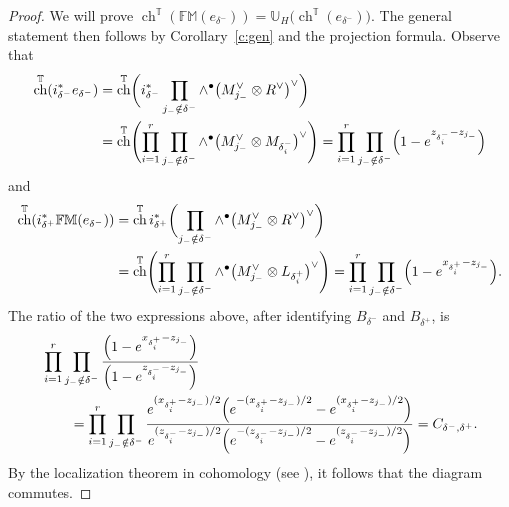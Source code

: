 \documentclass[11pt]{article}
\numberwithin{equation}{section}
\numberwithin{equation}{section}
\newcommand{\UU}{\mathbb{U}}
\newcommand{\torus}{\mathbb{T}}
\newcommand{\FM}{\mathbb{FM}}
\DeclareMathOperator{\ch}{ch}
\newcommand{\MB}{M}
\newcommand{\LB}{L}
\newcommand{\z}{z}
\newcommand{\x}{x}
\begin{document}
\begin{proof}
We will prove
$\ch^\torus(\FM(e_{\delta^-})) = \UU_H \bigl( \ch^\torus(e_{\delta^-})\bigr)$.
 The general statement then follows by Corollary~\ref{c:gen} and the projection formula.
Observe that
\begin{align*}
\ch^\torus( i_{\delta^-}^* e_{\delta^-}) &=\ch^\torus\biggl( i_{\delta^-}^* \prod_{j_- \notin \delta^-} \wedge^\bullet \bigl(\MB_{j_-}^\vee \otimes R^\vee\bigr)^\vee \biggr)
\\
& =\ch^\torus\Biggl( \prod_{i=1}^r \prod_{j_- \notin \delta^-} \wedge^\bullet \bigl(\MB_{j_-}^\vee \otimes \MB_{\delta^-_i} \bigr)^\vee \Biggr)
=
\prod_{i=1}^r \prod_{j_- \notin \delta^-} \Bigl( 1 - {\rm e}^{\z_{\delta^-_i} - \z_{j_-}}\Bigr)
\end{align*}
and
\begin{align*}
\ch^\torus( i_{\delta^+}^* \FM(e_{\delta^-} ))& = \ch^\torus i_{\delta^+}^*\biggl( \prod_{j_- \notin \delta^-} \wedge^\bullet \bigl(\MB_{j_-}^\vee \otimes R^\vee\bigr)^\vee
\biggr) \\
& =
\ch^\torus\Biggl( \prod_{i=1}^r \prod_{j_- \notin \delta^-} \wedge^\bullet \bigl(\MB_{j_-}^\vee \otimes \LB_{\delta^+_i} \bigr)^\vee \Biggr)
=
\prod_{i=1}^r \prod_{j_- \notin \delta^-} \Bigl( 1 - {\rm e}^{\x_{\delta^+_i} - \z_{j_-}}\Bigr).
\end{align*}
The ratio of the two expressions above, after identifying $B_{\delta^-}$ and $B_{\delta^+}$, is
\begin{align*}
& \prod_{i=1}^r \prod_{j_- \notin \delta^-} \frac{\Bigl( 1 - {\rm e}^{\x_{\delta^+_i} - \z_{j_-}}\Bigr)}{\Bigl( 1 - {\rm e}^{\z_{\delta^-_i} - \z_{j_-}}\Bigr)} \\
&\qquad{}= \prod_{i=1}^r \prod_{j_- \notin \delta^-} \frac{ {\rm e}^{(\x_{\delta^+_i} - \z_{j_-})/2}\Bigl( {\rm e}^{-(\x_{\delta^+_i} - \z_{j_-})/2} - {\rm e}^{(\x_{\delta^+_i} - \z_{j_-})/2}\Bigr)}{ {\rm e}^{(\z_{\delta^-_i} - \z_{j_-})/2}\Bigl( {\rm e}^{-(\z_{\delta^-_i} - \z_{j_-})/2} - {\rm e}^{(\z_{\delta^-_i} - \z_{j_-})/2}\Bigr)}
= C_{\delta^-, \delta^+}.
\end{align*}
By the localization theorem in cohomology (see \cite{AB}), it follows that the diagram commutes.
\end{proof}
\end{document}
